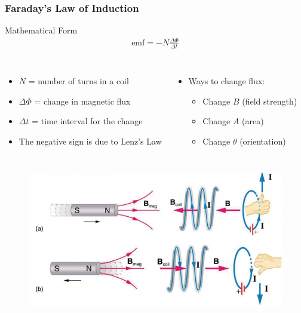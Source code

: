 \documentclass{beamer}
\begin{document}
\begin{frame}
\frametitle{Faraday's Law of Induction}
\begin{block}{Mathematical Form}
\begin{align}
\text{emf} = -N\frac{\Delta\Phi}{\Delta t}
\end{align}
\end{block}

\begin{columns}
\begin{itemize}
\item $N$ = number of turns in a coil
\item $\Delta\Phi$ = change in magnetic flux
\item $\Delta t$ = time interval for the change
\item The negative sign is due to Lenz's Law
\end{itemize}

\begin{itemize}
\item Ways to change flux:
\begin{itemize}
    \item Change $B$ (field strength)
    \item Change $A$ (area)
    \item Change $\theta$ (orientation)
\end{itemize}
\end{itemize}
\end{columns}
\end{frame}

\begin{frame}
\begin{figure}
    \centering
    \includegraphics[width=0.75\linewidth]{phys12-magnetism-magnetic-flux-through-loop.png}
\end{figure}
\end{frame}
\end{document}
